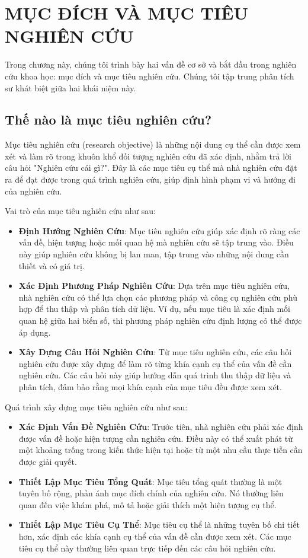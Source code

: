 \chapter{MỤC ĐÍCH VÀ MỤC TIÊU NGHIÊN CỨU}

Trong chương này, chúng tôi trình bày hai vấn đề cơ sở và bắt đầu trong nghiên cứu khoa học: mục đích và mục tiêu nghiên cứu. Chúng tôi tập trung phân tích sư khát biệt giữa hai khái niệm này.


\section{Thế nào là mục tiêu nghiên cứu?}

Mục tiêu nghiên cứu (research objective) là những nội dung cụ thể cần được xem xét và làm rõ trong khuôn khổ đối tượng nghiên cứu đã xác định, nhằm trả lời câu hỏi "Nghiên cứu cái gì?". Đây là các mục tiêu cụ thể mà nhà nghiên cứu đặt ra để đạt được trong quá trình nghiên cứu, giúp định hình phạm vi và hướng đi của nghiên cứu.

Vai trò của mục tiêu nghiên cứu như sau:
\begin{itemize}
    \item \textbf{Định Hướng Nghiên Cứu}: Mục tiêu nghiên cứu giúp xác định rõ ràng các vấn đề, hiện tượng hoặc mối quan hệ mà nghiên cứu sẽ tập trung vào. Điều này giúp nghiên cứu không bị lan man, tập trung vào những nội dung cần thiết và có giá trị.
    \item \textbf{Xác Định Phương Pháp Nghiên Cứu}: Dựa trên mục tiêu nghiên cứu, nhà nghiên cứu có thể lựa chọn các phương pháp và công cụ nghiên cứu phù hợp để thu thập và phân tích dữ liệu. Ví dụ, nếu mục tiêu là xác định mối quan hệ giữa hai biến số, thì phương pháp nghiên cứu định lượng có thể được áp dụng.
    \item \textbf{Xây Dựng Câu Hỏi Nghiên Cứu}: Từ mục tiêu nghiên cứu, các câu hỏi nghiên cứu được xây dựng để làm rõ từng khía cạnh cụ thể của vấn đề cần nghiên cứu. Các câu hỏi này giúp hướng dẫn quá trình thu thập dữ liệu và phân tích, đảm bảo rằng mọi khía cạnh của mục tiêu đều được xem xét.
\end{itemize}

Quá trình xây dựng mục tiêu nghiên cứu như sau:
\begin{itemize}
    \item \textbf{Xác Định Vấn Đề Nghiên Cứu}: Trước tiên, nhà nghiên cứu phải xác định được vấn đề hoặc hiện tượng cần nghiên cứu. Điều này có thể xuất phát từ một khoảng trống trong kiến thức hiện tại hoặc từ một nhu cầu thực tiễn cần được giải quyết.
    \item \textbf{Thiết Lập Mục Tiêu Tổng Quát}: Mục tiêu tổng quát thường là một tuyên bố rộng, phản ánh mục đích chính của nghiên cứu. Nó thường liên quan đến việc khám phá, mô tả hoặc giải thích một hiện tượng cụ thể.
    \item \textbf{Thiết Lập Mục Tiêu Cụ Thể}: Mục tiêu cụ thể là những tuyên bố chi tiết hơn, xác định các khía cạnh cụ thể của vấn đề cần được xem xét. Các mục tiêu cụ thể này thường liên quan trực tiếp đến các câu hỏi nghiên cứu.
\end{itemize}

